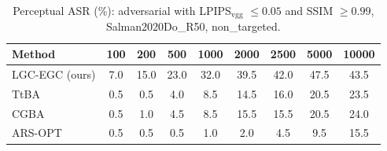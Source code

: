 \begin{table}[t]
\centering\footnotesize
\caption{Perceptual ASR (\%): adversarial with LPIPS$_{\mathrm{vgg}}$ $\le 0.05$ and SSIM $\ge 0.99$, Salman2020Do\_R50, non\_targeted.}
\begin{tabular}{lcccccccc}
\toprule
Method & 100 & 200 & 500 & 1000 & 2000 & 2500 & 5000 & 10000 \\
\midrule
LGC-EGC (ours) & 7.0 & 15.0 & 23.0 & 32.0 & 39.5 & 42.0 & 47.5 & 43.5 \\
TtBA & 0.5 & 0.5 & 4.0 & 8.5 & 14.5 & 16.0 & 20.5 & 23.5 \\
CGBA & 0.5 & 1.0 & 4.5 & 8.5 & 15.5 & 15.5 & 20.5 & 24.0 \\
ARS-OPT & 0.5 & 0.5 & 0.5 & 1.0 & 2.0 & 4.5 & 9.5 & 15.5 \\
\bottomrule
\end{tabular}
\end{table}
